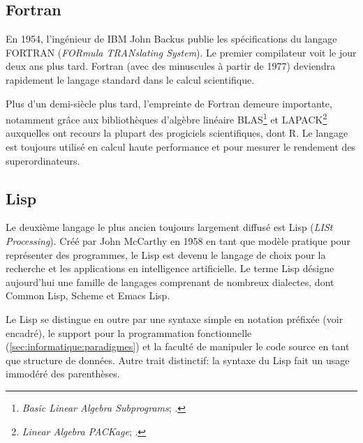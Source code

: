\subsection{Fortran}
\label{sec:informatique:historique:fortran}

En 1954, l'ingénieur de IBM John Backus publie les spécifications du
langage FORTRAN (\emph{FORmula TRANslating System}). Le premier
compilateur voit le jour deux ans plus tard. Fortran (avec des
minuscules à partir de 1977) deviendra rapidement le langage standard
dans le calcul scientifique.

Plus d'un demi-siècle plus tard, l'empreinte de Fortran demeure
importante, notamment grâce aux bibliothèques d'algèbre linéaire
BLAS\footnote{%
  \emph{Basic Linear Algebra Subprograms};
  .} %
et LAPACK\footnote{%
  \emph{Linear Algebra PACKage};
  .} %
auxquelles ont recours la plupart des progiciels scientifiques, dont
R. Le langage est toujours utilisé en calcul haute performance et pour
mesurer le rendement des superordinateurs.

\begin{figure}[t]
\end{figure}

\subsection{Lisp}
\label{sec:informatique:historique:lisp}

Le deuxième langage le plus ancien toujours largement diffusé est Lisp
(\emph{LISt Processing}). Créé par John McCarthy en 1958 en tant que
modèle pratique pour représenter des programmes, le Lisp est devenu le
langage de choix pour la recherche et les applications en intelligence
artificielle. Le terme Lisp désigne aujourd'hui une famille de
langages comprenant de nombreux dialectes, dont Common Lisp, Scheme et
Emacs Lisp.

Le Lisp se distingue en outre par une syntaxe simple en notation
préfixée (voir encadré), le support pour la programmation
fonctionnelle (\autoref{sec:informatique:paradigmes}) et la faculté de
manipuler le code source en tant que structure de données. Autre trait
distinctif: la syntaxe du Lisp fait un usage immodéré des parenthèses.

